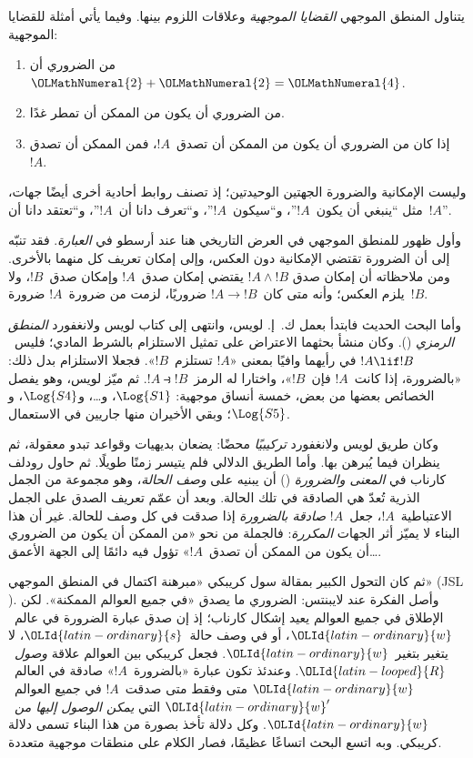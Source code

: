 \documentclass[../../../include/open-logic-section]{subfiles}
\begin{document}


يتناول المنطق الموجهي \emph{القضايا الموجهية} وعلاقات اللزوم بينها.
وفيما يأتي أمثلة للقضايا الموجهية:
\begin{enumerate}
\item من الضروري أن~$\OLMathNumeral{2}+\OLMathNumeral{2}=\OLMathNumeral{4}$.
\item من الضروري أن يكون من الممكن أن تمطر غدًا.
\item إذا كان من الضروري أن يكون من الممكن أن تصدق~$!A$، فمن الممكن أن تصدق~$!A$.
\end{enumerate}
وليست الإمكانية والضرورة الجهتين الوحيدتين؛ إذ تصنف روابط أحادية أخرى
أيضًا جهات، مثل ``ينبغي أن يكون~$!A$''، و``سيكون~$!A$''، و``تعرف دانا
أن~$!A$''، و``تعتقد دانا أن~$!A$''.

وأول ظهور للمنطق الموجهي في العرض التاريخي هنا عند أرسطو في
\emph{العبارة}. فقد تنبّه إلى أن الضرورة تقتضي الإمكانية دون العكس،
وإلى إمكان تعريف كل منهما بالأخرى. ومن ملاحظاته أن إمكان صدق
$!A \land !B$ يقتضي إمكان صدق~$!A$ وإمكان صدق~$!B$، ولا يلزم
العكس؛ وأنه متى كان~$!A \to !B$ ضروريًا، لزمت من ضرورة~$!A$
ضرورة~$!B$.

وأما البحث الحديث فابتدأ بعمل ك.~إ. لويس، وانتهى إلى كتاب لويس
ولانغفورد \emph{المنطق الرمزي} (). وكان منشأ بحثهما الاعتراض على
تمثيل الاستلزام بالشرط المادي؛ فليس~$!A \lif !B$ في رأيهما وافيًا
بمعنى «$!A$ تستلزم~$!B$». فجعلا الاستلزام بدل ذلك: «بالضرورة،
إذا كانت~$!A$ فإن~$!B$»، واختارا له الرمز~$!A \strictif !B$.
ثم ميّز لويس، وهو يفصل الخصائص بعضها من بعض، خمسة أنساق موجهية:
$\Log{S1}$، و\ldots، و$\Log{S4}$، و$\Log{S5}$؛ وبقي الأخيران
منها جاريين في الاستعمال.

وكان طريق لويس ولانغفورد \emph{تركيبيًا} محضًا: يضعان بديهيات
وقواعد تبدو معقولة، ثم ينظران فيما يُبرهن بها. وأما الطريق الدلالي
فلم يتيسر زمنًا طويلًا. ثم حاول رودلف كارناب في \emph{المعنى والضرورة}
() أن يبنيه على \emph{وصف الحالة}، وهو مجموعة من الجمل الذرية
تُعدّ هي الصادقة في تلك الحالة. وبعد أن عمّم تعريف الصدق على الجمل
الاعتباطية~$!A$، جعل~$!A$ \emph{صادقة بالضرورة} إذا صدقت في كل
وصف للحالة. غير أن هذا البناء لا يميّز أثر الجهات \emph{المكررة}:
فالجملة من نحو «من الممكن أن يكون من الضروري \ldots أن يكون من الممكن أن تصدق~$!A$»
تؤول فيه دائمًا إلى الجهة الأعمق.

ثم كان التحول الكبير بمقالة سول كريبكي «مبرهنة اكتمال في المنطق
الموجهي» (JSL ). وأصل الفكرة عند لايبنتس: الضروري ما يصدق
«في جميع العوالم الممكنة». لكن الإطلاق في جميع العوالم يعيد إشكال
كارناب؛ إذ إن صدق عبارة الضرورة في عالم~$\OLId{latin-ordinary}{w}$، أو في وصف حالة~$\OLId{latin-ordinary}{s}$،
لا يتغير بتغير~$\OLId{latin-ordinary}{w}$. فجعل كريبكي بين العوالم علاقة \emph{وصول}~$\OLId{latin-looped}{R}$.
وعندئذ تكون عبارة «بالضرورة~$!A$» صادقة في العالم~$\OLId{latin-ordinary}{w}$ متى وفقط
متى صدقت~$!A$ في جميع العوالم~$\OLId{latin-ordinary}{w}'$ التي \emph{يمكن الوصول إليها
من}~$\OLId{latin-ordinary}{w}$. وكل دلالة تأخذ بصورة من هذا البناء تسمى دلالة كريبكي.
وبه اتسع البحث اتساعًا عظيمًا، فصار الكلام على منطقات موجهية متعددة.
\end{document}
